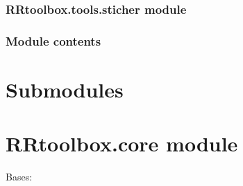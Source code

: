 \documentclass[letterpaper,10pt,english]{sphinxmanual}
\begin{document}
\subsubsection{RRtoolbox.tools.sticher module}
\label{RRtoolbox.tools:rrtoolbox-tools-sticher-module}\label{RRtoolbox.tools:module-RRtoolbox.tools.sticher}

\begin{fulllineitems}
\label{RRtoolbox.tools:RRtoolbox.tools.sticher.stich}
\end{fulllineitems}



\subsubsection{Module contents}
\label{RRtoolbox.tools:module-contents}\label{RRtoolbox.tools:module-RRtoolbox.tools}

\section{Submodules}
\label{RRtoolbox:submodules}

\section{RRtoolbox.core module}
\label{RRtoolbox:module-RRtoolbox.core}\label{RRtoolbox:rrtoolbox-core-module}

\begin{fulllineitems}
\label{RRtoolbox:RRtoolbox.core.f}
\end{fulllineitems}


\begin{fulllineitems}
\label{RRtoolbox:RRtoolbox.core.rrbox}
Bases: 

\begin{fulllineitems}
\label{RRtoolbox:RRtoolbox.core.rrbox.asift}
\end{fulllineitems}


\end{fulllineitems}
\end{document}
